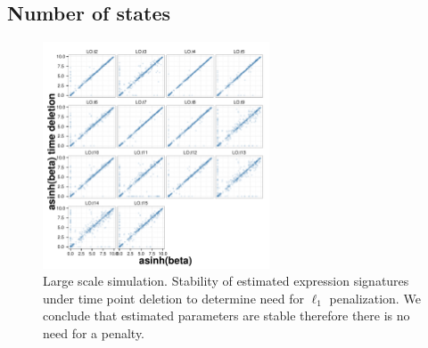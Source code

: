 \subsection{Number of states}
\label{sec:number-states-res}

\begin{figure}
  \centering
  \includegraphics[width=0.6\textwidth]{pics/no-pen-sim.pdf}
  \caption{Large scale simulation. Stability of estimated expression signatures under time point deletion to determine need for $\ell_1$ penalization. We conclude that estimated parameters are stable therefore there is no need for a penalty.}
  \label{fig:lrg-sim-stab-l1}
\end{figure}


